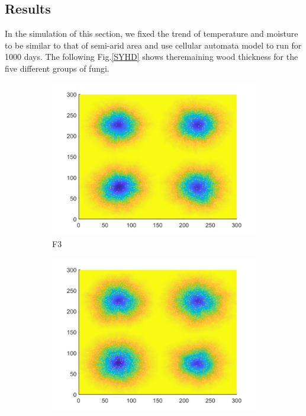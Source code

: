 \documentclass[a4paper,12pt]{article}
\begin{document}
\subsection{Results}
\par In the simulation of this section, we fixed the trend of temperature and moisture to be similar to that of semi-arid area and use cellular automata model to run for 1000 days. The following Fig.\eqref{SYHD} shows theremaining wood thickness for the five different groups of fungi.
\begin{figure}[H]
	\centering
	\begin{subfigure}{0.3\textwidth}
		\includegraphics[width=\textwidth]{./T5Figure/K1N1/K1N1L.pdf}
		\caption{F3}
	\end{subfigure}
	\begin{subfigure}{0.3\textwidth}
		\includegraphics[width=\textwidth]{./T5Figure/K1N2/K1N2L.pdf}

\end{subfigure}
\end{figure}
\end{document}
